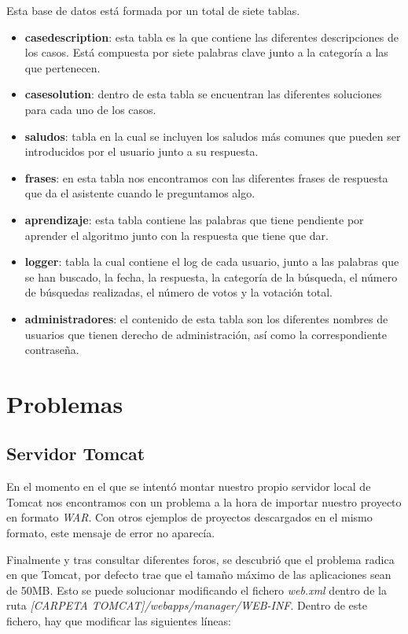 Esta base de datos está formada por un total de siete tablas.

\begin{itemize}
	\tightlist
	\item
	\textbf{casedescription}: esta tabla es la que contiene las diferentes descripciones de los casos. Está compuesta por siete palabras clave junto a la categoría a las que pertenecen.
	\item 
	\textbf{casesolution}: dentro de esta tabla se encuentran las diferentes soluciones para cada uno de los casos.
	\item
	\textbf{saludos}: tabla en la cual se incluyen los saludos más comunes que pueden ser introducidos por el usuario junto a su respuesta.
	\item 
	\textbf{frases}: en esta tabla nos encontramos con las diferentes frases de respuesta que da el asistente cuando le preguntamos algo.
	\item 
	\textbf{aprendizaje}: esta tabla contiene las palabras que tiene pendiente por aprender el algoritmo junto con la respuesta que tiene que dar.
	\item
	\textbf{logger}: tabla la cual contiene el log de cada usuario, junto a las palabras que se han buscado, la fecha, la respuesta, la categoría de la búsqueda, el número de búsquedas realizadas, el número de votos y la votación total.
	\item 
	\textbf{administradores}: el contenido de esta tabla son los diferentes nombres de usuarios que tienen derecho de administración, así como la correspondiente contraseña.
\end{itemize}

\section{Problemas}\label{problemas}
\subsection{Servidor Tomcat}

En el momento en el que se intentó montar nuestro propio servidor local de Tomcat nos encontramos con un problema a la hora de importar nuestro proyecto en formato \textit{WAR}. Con otros ejemplos de proyectos descargados en el mismo formato, este mensaje de error no aparecía.

Finalmente y tras consultar diferentes foros, se descubrió que el problema radica en que Tomcat, por defecto trae que el tamaño máximo de las aplicaciones sean de 50MB. Esto se puede solucionar modificando el fichero \textit{web.xml} dentro de la ruta \textit{[CARPETA TOMCAT]/webapps/manager/WEB-INF}. Dentro de este fichero, hay que modificar las siguientes líneas:


